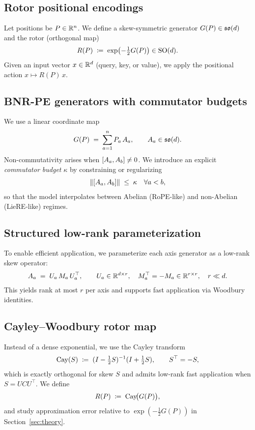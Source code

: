 \subsection{Rotor positional encodings}
Let positions be $P\in\mathbb{R}^n$.
We define a skew-symmetric generator $G(P)\in\mathfrak{so}(d)$ and the rotor (orthogonal map)
\begin{equation}
  R(P) \;\coloneqq\; \exp\!\left(-\tfrac12 G(P)\right)\in \mathrm{SO}(d).
\end{equation}
Given an input vector $x\in\mathbb{R}^d$ (query, key, or value), we apply the positional action $x \mapsto R(P)\,x$.

\subsection{BNR-PE generators with commutator budgets}
We use a linear coordinate map
\begin{equation}
  G(P) \;=\; \sum_{a=1}^{n} P_a\,A_a, \qquad A_a \in \mathfrak{so}(d).
\end{equation}
Non-commutativity arises when $\left[ A_a, A_b \right]\neq 0$.
We introduce an explicit \emph{commutator budget} $\kappa$ by constraining or regularizing
\begin{equation}
  \left\lVert \left[ A_a, A_b \right] \right\rVert \;\le\; \kappa \quad \forall a<b,
\end{equation}
so that the model interpolates between Abelian (RoPE-like) and non-Abelian (LieRE-like) regimes.

\subsection{Structured low-rank parameterization}
To enable efficient application, we parameterize each axis generator as a low-rank skew operator:
\begin{equation}
  A_a \;=\; U_a\,M_a\,U_a^\top,\qquad U_a\in\mathbb{R}^{d\times r}, \quad M_a^\top=-M_a \in \mathbb{R}^{r\times r},\quad r\ll d.
\end{equation}
This yields rank at most $r$ per axis and supports fast application via Woodbury identities.

\subsection{Cayley--Woodbury rotor map}
Instead of a dense exponential, we use the Cayley transform
\begin{equation}
  \mathrm{Cay}(S) \;\coloneqq\; (I-\tfrac12 S)^{-1}(I+\tfrac12 S),
  \qquad S^\top=-S,
\end{equation}
which is exactly orthogonal for skew $S$ and admits low-rank fast application when $S=UCU^\top$.
We define
\begin{equation}
  R(P) \;\coloneqq\; \mathrm{Cay}\!\big(G(P)\big),
\end{equation}
and study approximation error relative to $\exp(-\tfrac12 G(P))$ in Section~\ref{sec:theory}.
